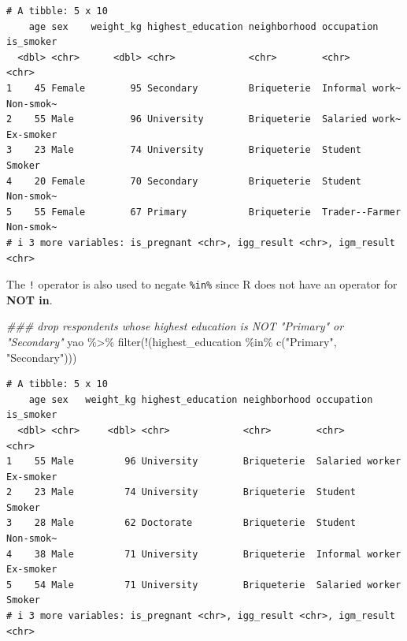 \documentclass[
  letterpaper,
  DIV=11,
  numbers=noendperiod]{scrreprt}
\newenvironment{Shaded}{\begin{snugshade}}{\end{snugshade}}
\newcommand{\DocumentationTok}[1]{\textcolor[rgb]{0.37,0.37,0.37}{\textit{#1}}}
\newcommand{\FunctionTok}[1]{\textcolor[rgb]{0.28,0.35,0.67}{#1}}
\newcommand{\NormalTok}[1]{\textcolor[rgb]{0.00,0.23,0.31}{#1}}
\newcommand{\SpecialCharTok}[1]{\textcolor[rgb]{0.37,0.37,0.37}{#1}}
\newcommand{\StringTok}[1]{\textcolor[rgb]{0.13,0.47,0.30}{#1}}
\begin{document}
\begin{verbatim}
# A tibble: 5 x 10
    age sex    weight_kg highest_education neighborhood occupation     is_smoker
  <dbl> <chr>      <dbl> <chr>             <chr>        <chr>          <chr>    
1    45 Female        95 Secondary         Briqueterie  Informal work~ Non-smok~
2    55 Male          96 University        Briqueterie  Salaried work~ Ex-smoker
3    23 Male          74 University        Briqueterie  Student        Smoker   
4    20 Female        70 Secondary         Briqueterie  Student        Non-smok~
5    55 Female        67 Primary           Briqueterie  Trader--Farmer Non-smok~
# i 3 more variables: is_pregnant <chr>, igg_result <chr>, igm_result <chr>
\end{verbatim}

The \texttt{!} operator is also used to negate \texttt{\%in\%} since R
does not have an operator for \textbf{NOT in}.

\begin{Shaded}
\begin{Highlighting}[]
\DocumentationTok{\#\#\# drop respondents whose highest education is NOT "Primary" or "Secondary"}
\NormalTok{yao }\SpecialCharTok{\%\textgreater{}\%} \FunctionTok{filter}\NormalTok{(}\SpecialCharTok{!}\NormalTok{(highest\_education }\SpecialCharTok{\%in\%} \FunctionTok{c}\NormalTok{(}\StringTok{"Primary"}\NormalTok{, }\StringTok{"Secondary"}\NormalTok{)))}
\end{Highlighting}
\end{Shaded}

\begin{verbatim}
# A tibble: 5 x 10
    age sex   weight_kg highest_education neighborhood occupation      is_smoker
  <dbl> <chr>     <dbl> <chr>             <chr>        <chr>           <chr>    
1    55 Male         96 University        Briqueterie  Salaried worker Ex-smoker
2    23 Male         74 University        Briqueterie  Student         Smoker   
3    28 Male         62 Doctorate         Briqueterie  Student         Non-smok~
4    38 Male         71 University        Briqueterie  Informal worker Ex-smoker
5    54 Male         71 University        Briqueterie  Salaried worker Smoker   
# i 3 more variables: is_pregnant <chr>, igg_result <chr>, igm_result <chr>
\end{verbatim}
\end{document}

